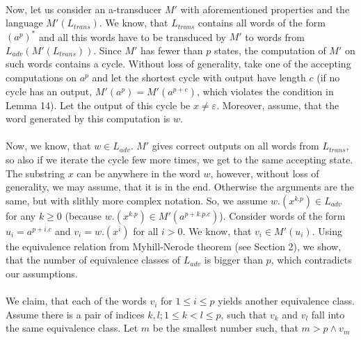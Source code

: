 \paragraph{}
Now, let us consider an a-transducer $M'$ with aforementioned properties and the language $M'(L_{trans})$. We know, that $L_{trans}$ contains all words of the form $(a^p)^*$ and all this words have to be transduced by $M'$ to words from $L_{adv} (M'(L_{trans}))$. Since $M'$ has fewer than $p$ states, the computation of $M'$ on such words contains a cycle. Without loss of generality, take one of the accepting computations on $a^p$ and let the shortest cycle with output have length $c$ (if no cycle has an output, $M'(a^p) = M'(a^{p+c})$, which violates the condition in Lemma 14). Let the output of this cycle be $x \neq \varepsilon$. Moreover, assume, that the word generated by this computation is $w$.

\paragraph{}
Now, we know, that $w \in L_{adv}$. $M'$ gives correct outputs on all words from $L_{trans}$, so also if we iterate the cycle few more times, we get to the same accepting state.  The substring $x$ can be anywhere in the word $w$, however, without loss of generality, we may assume, that it is in the end. Otherwise the arguments are the same, but with slithly more complex notation. So, we assume $w.(x^{k.p}) \in L_{adv}$ for any $k \geq 0$ (because $w.(x^{k.p}) \in M'(a^{p+k.p.c})$). Consider words of the form $u_i = a^{p+i.c}$ and $v_i = w.(x^i)$ for all $i > 0$. We know, that $v_i \in M'(u_i)$. Using the equivalence relation from Myhill-Nerode theorem (see Section 2), we show, that the number of equivalence classes of $L_{adv}$ is bigger than $p$, which contradicts our assumptions.

\paragraph{}
We claim, that each of the words $v_i$ for $1 \leq i \leq p$ yields another equivalence class. Assume there is a pair of indices $k,l; 1 \leq k < l \leq p$, such that $v_k$ and $v_l$ fall into the same equivalence class. Let $m$ be the smallest number such, that $m>p \wedge v_m$

